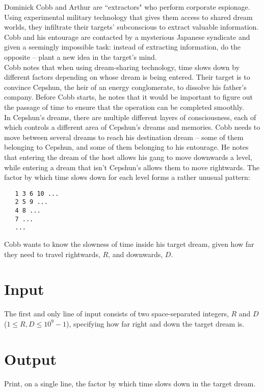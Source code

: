 
\noindent Dominick Cobb and Arthur are ``extractors" who perform corporate espionage. Using experimental military technology that gives them access to shared dream worlds, they infiltrate their targets' subconscious to extract valuable information. Cobb and his entourage are contacted by a mysterious Japanese syndicate and given a seemingly impossible task: instead of extracting information, do the opposite -- plant a new idea in the target's mind.\\

Cobb notes that when using dream-sharing technology, time slows down by different factors depending on whose dream is being entered. Their target is to convince Cepshun, the heir of an energy conglomerate, to dissolve his father's company. Before Cobb starts, he notes that it would be important to figure out the passage of time to ensure that the operation can be completed smoothly.\\

In Cepshun's dreams, there are multiple different layers of consciousness, each of which controls a different area of Cepshun's dreams and memories. Cobb needs to move between several dreams to reach his destination dream -- some of them belonging to Cepshun, and some of them belonging to his entourage. He notes that entering the dream of the host allows his gang to move downwards a level, while entering a dream that isn't Cepshun's allows them to move rightwards. The factor by which time slows down for each level forms a rather unusual pattern:

\begin{verbatim}
   1 3 6 10 ...
   2 5 9 ...
   4 8 ...
   7 ...
   ...
\end{verbatim}

\noindent Cobb wants to know the slowness of time inside his target dream, given how far they need to travel rightwards, $R$, and downwards, $D$.

\section*{Input}
The first and only line of input consists of two space-separated integers, $R$ and $D$ ($1 \leq R, D \leq 10^{9} - 1$), specifying how far right and down the target dream is.

\section*{Output}
Print, on a single line, the factor by which time slows down in the target dream.
